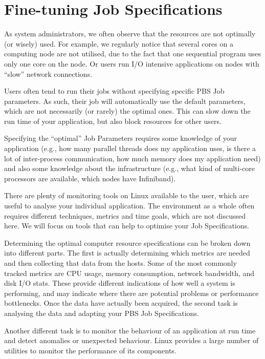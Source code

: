 \chapter{Fine-tuning Job Specifications}
\label{ch:fine-tuning-job-specifications}

As \hpc system administrators, we often observe that the \hpc resources are
not optimally (or wisely) used. For example, we regularly notice that several
cores on a computing node are not utilised, due to the fact that one sequential
program uses only one core on the node. Or users run I/O intensive applications
on nodes with ``slow'' network connections.

Users often tend to run their jobs without specifying specific PBS Job
parameters.  As such, their job will automatically use the default parameters,
which are not necessarily (or rarely) the optimal ones.  This can slow down the
run time of your application, but also block \hpc resources for other users.

Specifying the ``optimal'' Job Parameters requires some knowledge of your
application (e.g., how many parallel threads does my application uses, is there
a lot of inter-process communication, how much memory does my application need)
and also some knowledge about the \hpc infrastructure (e.g., what kind of
multi-core processors are available, which nodes have Infiniband).

There are plenty of monitoring tools on Linux available to the user, which are
useful to analyse your individual application. The \hpc environment as a
whole often requires different techniques, metrics and time goals, which are
not discussed here. We will focus on tools that can help to optimise your Job
Specifications.

Determining the optimal computer resource specifications can be broken down
into different parts. The first is actually determining which metrics are
needed and then collecting that data from the hosts. Some of the most commonly
tracked metrics are CPU usage, memory consumption, network bandwidth, and disk
I/O stats. These provide different indications of how well a system is
performing, and may indicate where there are potential problems or performance
bottlenecks. Once the data have actually been acquired, the second task is
analysing the data and adapting your PBS Job Specifications.

Another different task is to monitor the behaviour of an application at run time and
detect anomalies or unexpected behaviour. Linux provides a large number of
utilities to monitor the performance of its components.

